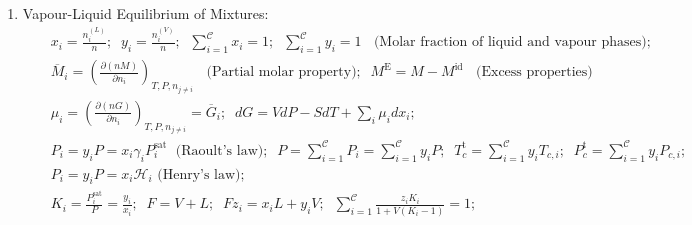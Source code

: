 \documentclass[12pts,a4paper,amsmath,amssymb,floatfix]{article}%
\newcommand{\frc}{\displaystyle\frac}
\newcommand{\Partial}[3][error]{\left(\frc{\partial #1}{\partial #2}\right)_{#3}}
\newcommand{\mfr}[3][error]{#1_{#2}^{\left(#3\right)}}
\newcommand{\summation}[3][error]{\sum\limits_{#2}^{#3}#1}
\begin{document}
\begin{enumerate}[1.]
\item Vapour-Liquid Equilibrium of Mixtures:
  \begin{eqnarray}
    && x_{i} = \frc{\mfr[n]{i}{L}}{n};\;\; y_{i} = \frc{\mfr[n]{i}{V}}{n};\;\; \summation[x_{i}]{i=1}{\mathcal{C}} = 1;\;\;\summation[y_{i}]{i=1}{\mathcal{C}} = 1\;\; \text{ (Molar fraction of liquid and vapour phases)}; \nonumber \\
    && \overline{M}_{i} = \Partial[(nM)]{n_{i}}{T,P,n_{j\ne i}}\;\; \text{ (Partial molar property)};\;\; M^{\text{E}} = M - M^{\text{id}}\;\;\text{ (Excess properties)} \nonumber \\
    && \mu_{i} = \Partial[(nG)]{n_{i}}{T,P,n_{j\ne i}} = \overline{G}_{i}; \;\; dG = VdP -SdT + \summation[\mu_{i}dx_{i}]{i}{}; \nonumber \\
    && P_{i} = y_{i}P = x_{i}\gamma_{i}P_{i}^{\text{sat}}\; \text{ (Raoult's law)};\;\;P = \summation[P_{i}]{i=1}{\mathcal{C}} = \summation[y_{i}P]{i=1}{\mathcal{C}};\;\; T_{c}^{\text{t}} = \summation[y_{i}T_{c,i}]{i=1}{\mathcal{C}};\;\; P_{c}^{\text{t}} = \summation[y_{i}P_{c,i}]{i=1}{\mathcal{C}}; \nonumber \\
    && P_{i} = y_{i}P = x_{i}\mathcal{H}_{i} \text{ (Henry's law)}; \nonumber \\
    && K_{i} = \frc{P_{i}^{\text{sat}}}{P} = \frc{y_{i}}{x_{i}};\;\; F = V + L;\;\; Fz_{i} = x_{i}L + y_{i}V; \;\; \summation[\frc{z_{i}K_{i}}{1+V\left(K_{i}-1\right)}]{i=1}{\mathcal{C}} = 1;\nonumber 
  \end{eqnarray}


\end{enumerate}
\end{document}
